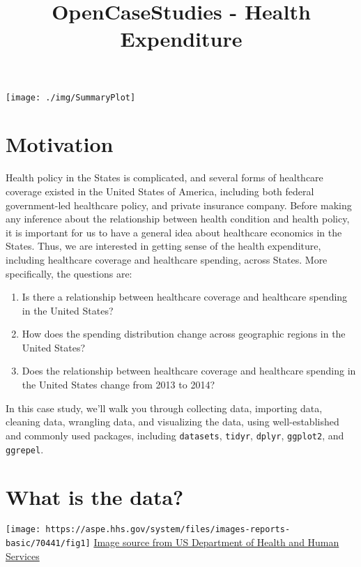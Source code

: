 \documentclass[]{article}
\title{OpenCaseStudies - Health Expenditure}
\author{}
\date{}
\providecommand{\tightlist}{%
  \setlength{\itemsep}{0pt}\setlength{\parskip}{0pt}}
\begin{document}
\maketitle

{
\setcounter{tocdepth}{2}
\tableofcontents
}
\texttt{[image: ./img/SummaryPlot]}

\hypertarget{motivation}{%
\section{Motivation}\label{motivation}}

Health policy in the States is complicated, and several forms of
healthcare coverage existed in the United States of America, including
both federal government-led healthcare policy, and private insurance
company. Before making any inference about the relationship between
health condition and health policy, it is important for us to have a
general idea about healthcare economics in the States. Thus, we are
interested in getting sense of the health expenditure, including
healthcare coverage and healthcare spending, across States. More
specifically, the questions are:

\begin{enumerate}
\def\labelenumi{\arabic{enumi}.}
\tightlist
\item
  Is there a relationship between healthcare coverage and healthcare
  spending in the United States?\\
\item
  How does the spending distribution change across geographic regions in
  the United States?\\
\item
  Does the relationship between healthcare coverage and healthcare
  spending in the United States change from 2013 to 2014?
\end{enumerate}

In this case study, we'll walk you through collecting data, importing
data, cleaning data, wrangling data, and visualizing the data, using
well-established and commonly used packages, including
\texttt{datasets}, \texttt{tidyr}, \texttt{dplyr}, \texttt{ggplot2}, and
\texttt{ggrepel}.

\hypertarget{what-is-the-data}{%
\section{What is the data?}\label{what-is-the-data}}

\texttt{[image: https://aspe.hhs.gov/system/files/images-reports-basic/70441/fig1]}
\href{https://aspe.hhs.gov/basic-report/overview-uninsured-united-states-summary-2011-current-population-survey}{Image
source from US Department of Health and Human Services}
\end{document}
